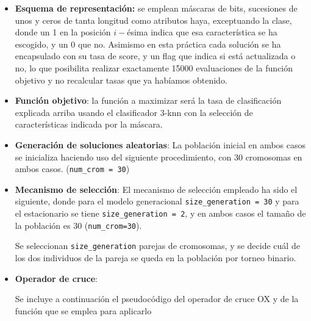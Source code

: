 \documentclass[a4paper,11pt]{article}
\begin{document}
\begin{itemize} 
\item \textbf{Esquema de representación:} se emplean máscaras de bits, sucesiones de unos y ceros de tanta longitud como atributos haya,
exceptuando la clase, donde un 1 en la posición $i-$ésima indica que esa característica se ha escogido, y un $0$ que no.
Asimismo en esta práctica cada solución se ha encapsulado con su tasa de score, y un flag que indica si está actualizada o
no, lo que posibilita realizar exactamente 15000 evaluaciones de la función objetivo y no recalcular tasas que ya habíamos
obtenido.

\item \textbf{Función objetivo}: la función a maximizar será la tasa de clasificación explicada arriba usando el clasificador
3-knn con la selección de características indicada por la máscara.\\

  \small\texttt{}
  \normalsize
  
\item \textbf{Generación de soluciones aleatorias}:
  La población inicial en ambos casos se inicializa haciendo uso del siguiente procedimiento, con 30 cromosomas en ambos casos.
  (\texttt{num\_crom = 30})\\
  
  \small\texttt{}
  \normalsize

\item \textbf{Mecanismo de selección}:
  El mecanismo de selección empleado ha sido el siguiente, donde para el modelo generacional \texttt{size\_generation = 30} y para
  el estacionario se tiene \texttt{size\_generation = 2}, y en ambos casos el tamaño de la población es 30 (\texttt{num\_crom=30}).

  Se seleccionan \texttt{size\_generation} parejas de cromosomas, y se decide cuál de los dos individuos de la pareja se 
  queda en la población por torneo binario.\\
  
  \small\texttt{}
  \normalsize
  
  
\item \textbf{Operador de cruce}:

  Se incluye a continuación el pseudocódigo del operador de cruce OX y de la función que se emplea para aplicarlo\\

  \small\texttt{}
  \normalsize


\end{itemize}
\end{document}
